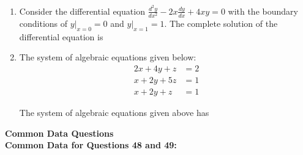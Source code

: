 \documentclass[journal,12pt,onecolumn]{IEEEtran}
\begin{document}
\begin{enumerate}[resume]
    \item Consider the differential equation \(\frac{d^2y}{dx^2} - 2x\frac{dy}{dx} + 4xy = 0\) with the boundary conditions of \(y|_{x=0} = 0\) and \(y|_{x=1} = 1\). The complete solution of the differential equation is

          \begin{enumerate}
          \end{enumerate}

    \item The system of algebraic equations given below:
          \begin{align}
              2x + 4y + z & = 2 \\
              x + 2y + 5z & = 1 \\
              x + 2y + z  & = 1
          \end{align}

          The system of algebraic equations given above has


          \begin{enumerate}
          \end{enumerate}

\end{enumerate}

\newpage

\large\textbf{Common Data Questions}\\

\normalsize\textbf{Common Data for Questions 48 and 49:}
\end{document}
